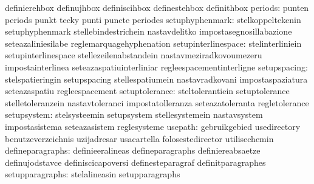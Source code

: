                                   definierehbox                    definujhbox
                                  definiscihbox                    definestehbox
                                  definithbox
                         periods: punten                           periods
                                  punkt                            tecky
                                  punti                            puncte
                                  periodes
                 setuphyphenmark: stelkoppeltekenin                setuphyphenmark
                                  stellebindestrichein             nastavdelitko
                                  impostasegnosillabazione         seteazaliniesilabe
                                  reglemarquagehyphenation
             setupinterlinespace: stelinterliniein                 setupinterlinespace
                                  stellezeilenabstandein           nastavmeziradkovoumezeru
                                  impostainterlinea                seteazaspatiuinterliniar
                                  regleespacementinterligne
                    setupspacing: stelspatieringin                 setupspacing
                                  stellespatiumein                 nastavradkovani
                                  impostaspaziatura                seteazaspatiu
                                  regleespacement
                  setuptolerance: steltolerantiein                 setuptolerance
                                  stelletoleranzein                nastavtoleranci
                                  impostatolleranza                seteazatoleranta
                                  regletolerance
                     setupsystem: stelsysteemin                    setupsystem
                                  stellesystemein                  nastavsystem
                                  impostasistema                   seteazasistem
                                  reglesysteme
                         usepath: gebruikgebied                    usedirectory
                                  benutzeverzeichnis               uzijadresar %
                                  usacartella                      folosestedirector
                                  utilisechemin
                defineparagraphs: definieeralineas                 defineparagraphs
                                  definiereabsaetze                definujodstavce
                                  definiscicapoversi               definesteparagraf
                                  definitparagraphes
                 setupparagraphs: stelalineasin                    setupparagraphs
